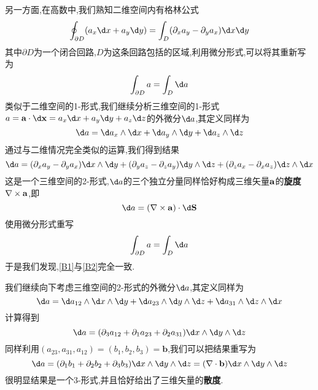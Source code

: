 另一方面,在高数中,我们熟知二维空间内有格林公式
\begin{equation}
    \oint_{\partial D}(a_x\dx+a_y\dy)=\int_D(\partial_xa_y-\partial_ya_x)\dx\dy
\end{equation}
其中$\partial D$为一个闭合回路,$D$为这条回路包括的区域,利用微分形式,可以将其重新写为
\begin{equation}\label{B1}
    \int_{\partial D}a=\int_D\d a
\end{equation}
类似于二维空间的1-形式,我们继续分析三维空间的1-形式$a=\mathbf{a}\cdot \d\mathbf{x}=a_x\dx+a_y\dy+a_z\dz$的外微分$\d a$,其定义同样为
\begin{equation}
    \d a=\d a_x\wedge \dx+\d a_y\wedge \d y+\d a_z\wedge \dz
\end{equation}
通过与二维情况完全类似的运算,我们得到结果
\begin{equation}
    \d a=(\partial_xa_y-\partial_ya_x)\dx\wedge \dy+(\partial_ya_z-\partial_za_y)\dy\wedge \dz+(\partial_za_x-\partial_xa_z)\dz\wedge \dx
\end{equation}
这是一个三维空间的2-形式,$\d a$的三个独立分量同样恰好构成三维矢量$\mathbf{a}$的\textbf{旋度}$\nabla\times\mathbf{a}$,即
\begin{equation}
    \d a=(\nabla\times\mathbf{a})\cdot \d\mathbf{S}
\end{equation}
使用微分形式重写
\begin{equation}\label{B2}
    \int_{\partial D}a=\int_D\d a
\end{equation}
于是我们发现,\ref{B1}与\ref{B2}完全一致.

我们继续向下考虑三维空间的2-形式的外微分$\d a$,其定义同样为
\begin{equation}
    \da=\da_{12}\wedge \dx\wedge \dy+\da_{23}\wedge \dy\wedge \dz+\da_{31}\wedge \dz\wedge \dx
\end{equation}
计算得到
\begin{equation}
    \da=(\partial_3a_{12}+\partial_1a_{23}+\partial_2a_{31})\dx\wedge \dy\wedge \dz
\end{equation}
同样利用$(a_{23},a_{31},a_{12})=(b_1,b_2,b_3)=\mathbf{b}$,我们可以把结果重写为
\begin{equation}
    \da=(\partial_1b_1+\partial_2b_2+\partial_3b_3)\dx\wedge \dy\wedge \dz=(\nabla\cdot\mathbf{b})\dx\wedge \dy\wedge \dz
\end{equation}
很明显结果是一个3-形式,并且恰好给出了三维矢量的\textbf{散度}.

